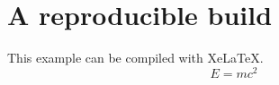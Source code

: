 \documentclass{article}
\begin{document}
\section{A reproducible build}
This example can be compiled with XeLaTeX.
\begin{equation}
  E = mc^2
\end{equation}
\end{document}
